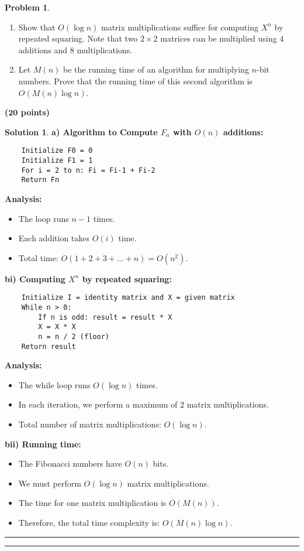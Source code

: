 \documentclass{article}
\theoremstyle{definition}
\newtheorem{problem}{Problem}
\def\fline{\rule{0.75\linewidth}{0.5pt}}
\newcommand{\finishline}{\begin{center}\fline\end{center}}
\newtheorem*{solution*}{Solution}
\newenvironment{solution}{\begin{solution*}}{{\finishline} \end{solution*}}
\newcommand{\grade}[1]{\hfill{\textbf{($\mathbf{#1}$ points)}}}
\begin{document}
\begin{problem}
\begin{enumerate}[label =\alph *)]
\begin{enumerate}[label =\roman*)]
    \item Show that $O(\log n)$ matrix multiplications suffice for computing $X^n$ by repeated squaring. Note that two $2 \times 2$ matrices can be multiplied using 4 additions and 8 multiplications.
    \item Let $M(n)$ be the running time of an algorithm for multiplying $n$-bit numbers. Prove that the running time of this second algorithm is $O(M(n)\log n)$.
\end{enumerate}


\end{enumerate}
\end{problem}\grade{20}

\begin{solution}
    
	\textbf{a) Algorithm to Compute \( F_n \) with \( O(n) \) additions:}

	\begin{verbatim}
	Initialize F0 = 0
	Initialize F1 = 1
	For i = 2 to n: Fi = Fi-1 + Fi-2
	Return Fn
	\end{verbatim}
	
	\textbf{Analysis:}
	\begin{itemize}
	    \item The loop runs \( n-1 \) times.
	    \item Each addition takes \( O(i) \) time.
	    \item Total time: \( O(1 + 2 + 3 + \ldots + n) = O(n^2) \).
	\end{itemize}
	
	\textbf{bi) Computing \( X^n \) by repeated squaring:}
	
	\begin{verbatim}
	Initialize I = identity matrix and X = given matrix
	While n > 0: 
	    If n is odd: result = result * X 
	    X = X * X 
	    n = n / 2 (floor)
	Return result
	\end{verbatim}
	
	\textbf{Analysis:}
	\begin{itemize}
	    \item The while loop runs \( O(\log n) \) times.
	    \item In each iteration, we perform a maximum of 2 matrix multiplications.
	    \item Total number of matrix multiplications: \( O(\log n) \).
	\end{itemize}
	
	\textbf{bii) Running time:}
	\begin{itemize}
	    \item The Fibonacci numbers have \( O(n) \) bits.
	    \item We must perform \( O(\log n) \) matrix multiplications.
	    \item The time for one matrix multiplication is \( O(M(n)) \).
	    \item Therefore, the total time complexity is: \( O(M(n) \log n) \).
	\end{itemize}
   
\end{solution}
\finishline
\end{document}
